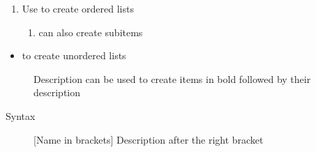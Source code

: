 \documentclass{uc-mse}
\begin{document}
\begin{enumerate}
    \item Use  to create ordered lists
    \begin{enumerate}
        \item {} can also create subitems
    \end{enumerate}
\end{enumerate}

\begin{itemize}
    \item {} to create unordered lists
\end{itemize}

\begin{description}
    \item [] Description can be used to create items in bold followed by their description
    \item [Syntax] [Name in brackets] Description after the right bracket
\end{description}
\end{document}
